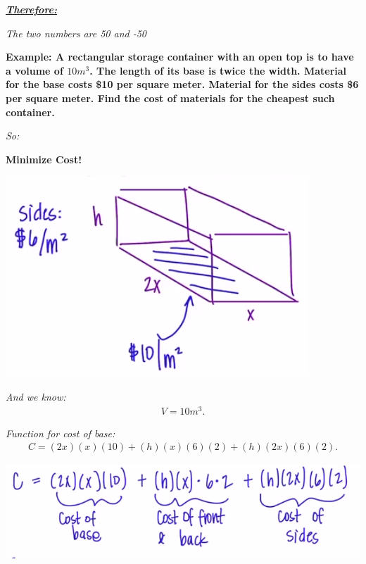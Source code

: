 \documentclass{report}
\begin{document}
  \bigbreak \noindent 
  \textbf{\textit{\underline{Therefore:}}}

  \bigbreak \noindent 
  \textit{The two numbers are 50 and -50}

 \bigbreak \noindent 
 \begin{mdframed}
   \textbf{Example: A rectangular storage container with an open top is to have a volume of $10m^{3}$. The length of its base is twice the width. Material for the base costs \$10 per square meter. Material 
     for the sides costs \$6 per square meter. Find the cost of materials for the cheapest such container.
   }
 \end{mdframed} 
 
 \bigbreak \noindent 
 \textit{So:}
 \bigbreak \noindent 
 \begin{center}
   \textbf{Minimize Cost!}
 \end{center}
 \begin{center}
   \includegraphics[scale=0.5]{ ./images/21.png  }
 \end{center}
 \bigbreak \noindent 
 \textit{And we know:}
 \begin{align*}
   V = 10m^{3}
 .\end{align*}

 \bigbreak \noindent 
 \textit{Function for cost of base:}
 \begin{align*}
   C = (2x)(x)(10) + (h)(x)(6)(2) + (h)(2x)(6)(2)
 .\end{align*}

 \bigbreak \noindent \begin{center}
   \includegraphics[scale=.5]{ ./images/22.png }
 \end{center}
\end{document}

